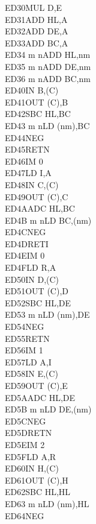 \documentclass[12pt,twoside,openright,a4paper]{book}
\begin{document}
\begin{multicols}{3}
{\begin{tabbing}
	ED30\>MUL D,E\ZXN\\
	ED31\>ADD HL,A\ZXN\\
	ED32\>ADD DE,A\ZXN\\
	ED33\>ADD BC,A\ZXN\\
	ED34 m n\>ADD HL,nm\ZXN\\
	ED35 m n\>ADD DE,nm\ZXN\\
	ED36 m n\>ADD BC,nm\ZXN\\
	ED40\>IN B,(C)\\
	ED41\>OUT (C),B\\
	ED42\>SBC HL,BC\\
	ED43 m n\>LD (nm),BC\\
	ED44\>NEG\\
	ED45\>RETN\\
	ED46\>IM 0\\
	ED47\>LD I,A\\
	ED48\>IN C,(C)\\
	ED49\>OUT (C),C\\
	ED4A\>ADC HL,BC\\
	ED4B m n\>LD BC,(nm)\\
	ED4C\>NEG\UNDOC\\
	ED4D\>RETI\\
	ED4E\>IM 0\UNDOC\\
	ED4F\>LD R,A\\
	ED50\>IN D,(C)\\
	ED51\>OUT (C),D\\
	ED52\>SBC HL,DE\\
	ED53 m n\>LD (nm),DE\\
	ED54\>NEG\UNDOC\\
	ED55\>RETN\UNDOC\\
	ED56\>IM 1\\
	ED57\>LD A,I\\
	ED58\>IN E,(C)\\
	ED59\>OUT (C),E\\
	ED5A\>ADC HL,DE\\
	ED5B m n\>LD DE,(nm)\\
	ED5C\>NEG\UNDOC\\
	ED5D\>RETN\UNDOC\\
	ED5E\>IM 2\\
	ED5F\>LD A,R\\
	ED60\>IN H,(C)\\
	ED61\>OUT (C),H\\
	ED62\>SBC HL,HL\\
	ED63 m n\>LD (nm),HL\\
	ED64\>NEG\UNDOC\\

\end{tabbing}}
\end{multicols}
\end{document}
